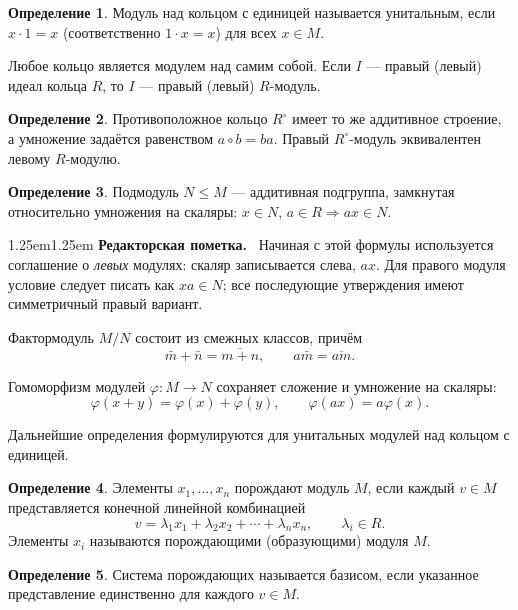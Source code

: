 \documentclass[12pt,a4paper,oneside,openany]{book}
\theoremstyle{definition}
\newtheorem{definition}{Определение}[chapter]
\theoremstyle{plain}
\theoremstyle{remark}
\newenvironment{editorialnote}
  {\begin{adjustwidth}{1.25em}{1.25em}\small
   \noindent\textcolor{editorred}{\sffamily\bfseries Редакторская пометка.}\ }
  {\par\end{adjustwidth}}
\begin{document}
\begin{definition}
Модуль над кольцом с единицей называется унитальным, если
$x\cdot1=x$ (соответственно $1\cdot x=x$) для всех $x\in M$.
\end{definition}

Любое кольцо является модулем над самим собой. Если $I$ --- правый
(левый) идеал кольца $R$, то $I$ --- правый (левый) $R$-модуль.

\begin{definition}
Противоположное кольцо $R^{\circ}$ имеет то же аддитивное строение, а
умножение задаётся равенством $a\circ b=ba$. Правый $R^{\circ}$-модуль
эквивалентен левому $R$-модулю.
\end{definition}

\begin{definition}
Подмодуль $N\leq M$ --- аддитивная подгруппа, замкнутая относительно
умножения на скаляры: $x\in N$, $a\in R\Rightarrow ax\in N$.
\end{definition}

\begin{editorialnote}
Начиная с этой формулы используется соглашение о \emph{левых} модулях:
скаляр записывается слева, $ax$. Для правого модуля условие следует
писать как $xa\in N$; все последующие утверждения имеют симметричный
правый вариант.
\end{editorialnote}

Фактормодуль $M/N$ состоит из смежных классов, причём
\[
  \bar m+\bar n=\overline{m+n},
  \qquad a\bar m=\overline{am}.
\]

Гомоморфизм модулей $\varphi\colon M\to N$ сохраняет сложение и
умножение на скаляры:
\[
  \varphi(x+y)=\varphi(x)+\varphi(y),
  \qquad
  \varphi(ax)=a\varphi(x).
\]


Дальнейшие определения формулируются для унитальных модулей над кольцом с
единицей.

\begin{definition}
Элементы $x_1,\ldots,x_n$ порождают модуль $M$, если каждый $v\in M$
представляется конечной линейной комбинацией
\[
  v=\lambda_1x_1+\lambda_2x_2+\cdots+\lambda_nx_n,
  \qquad \lambda_i\in R.
\]
Элементы $x_i$ называются порождающими (образующими) модуля $M$.
\end{definition}

\begin{definition}
Система порождающих называется базисом, если указанное представление
единственно для каждого $v\in M$.
\end{definition}
\end{document}
